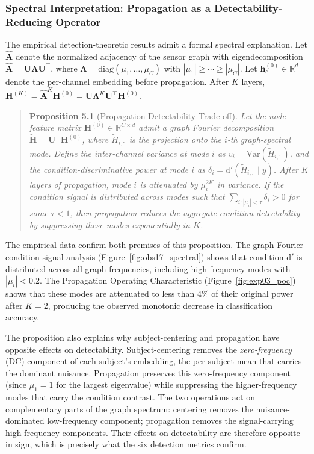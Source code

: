 \subsubsection{Spectral Interpretation: Propagation as a Detectability-Reducing Operator}

The empirical detection-theoretic results admit a formal spectral explanation. Let $\hat{\mathbf{A}}$ denote the normalized adjacency of the sensor graph with eigendecomposition $\hat{\mathbf{A}} = \mathbf{U}\boldsymbol{\Lambda}\mathbf{U}^\top$, where $\boldsymbol{\Lambda} = \text{diag}(\mu_1, \ldots, \mu_C)$ with $|\mu_1| \geq \cdots \geq |\mu_C|$. Let $\mathbf{h}_c^{(0)} \in \mathbb{R}^d$ denote the per-channel embedding before propagation. After $K$ layers, $\mathbf{H}^{(K)} = \hat{\mathbf{A}}^K \mathbf{H}^{(0)} = \mathbf{U}\boldsymbol{\Lambda}^K\mathbf{U}^\top \mathbf{H}^{(0)}$.

\begin{quote}
\textbf{Proposition 5.1} (Propagation-Detectability Trade-off). \emph{Let the node feature matrix $\mathbf{H}^{(0)} \in \mathbb{R}^{C \times d}$ admit a graph Fourier decomposition $\tilde{\mathbf{H}} = \mathbf{U}^\top \mathbf{H}^{(0)}$, where $\tilde{H}_{i,:}$ is the projection onto the $i$-th graph-spectral mode. Define the inter-channel variance at mode $i$ as $v_i = \text{Var}(\tilde{H}_{i,:})$, and the condition-discriminative power at mode $i$ as $\delta_i = \text{d}'(\tilde{H}_{i,:} \mid y)$. After $K$ layers of propagation, mode $i$ is attenuated by $\mu_i^{2K}$ in variance. If the condition signal is distributed across modes such that $\sum_{i: |\mu_i| < \tau} \delta_i > 0$ for some $\tau < 1$, then propagation reduces the aggregate condition detectability by suppressing these modes exponentially in $K$.}
\end{quote}

The empirical data confirm both premises of this proposition. The graph Fourier condition signal analysis (Figure~\ref{fig:obs17_spectral}) shows that condition d$'$ is distributed across all graph frequencies, including high-frequency modes with $|\mu_i| < 0.2$. The Propagation Operating Characteristic (Figure~\ref{fig:exp03_poc}) shows that these modes are attenuated to less than $4\%$ of their original power after $K = 2$, producing the observed monotonic decrease in classification accuracy.

The proposition also explains why subject-centering and propagation have opposite effects on detectability. Subject-centering removes the \emph{zero-frequency} (DC) component of each subject's embedding, the per-subject mean that carries the dominant nuisance. Propagation preserves this zero-frequency component (since $\mu_1 = 1$ for the largest eigenvalue) while suppressing the higher-frequency modes that carry the condition contrast. The two operations act on complementary parts of the graph spectrum: centering removes the nuisance-dominated low-frequency component; propagation removes the signal-carrying high-frequency components. Their effects on detectability are therefore opposite in sign, which is precisely what the six detection metrics confirm.

